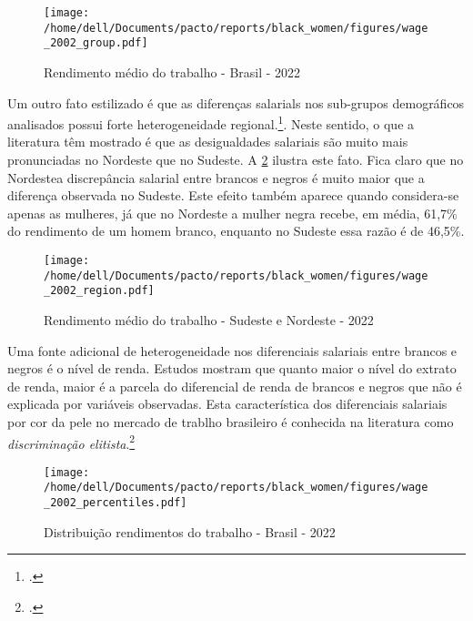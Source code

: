 \documentclass[12pt]{article}
\begin{document}
\begin{figure}[H]
    \centering
    \caption{Rendimento médio do trabalho - Brasil - 2022}
        \texttt{[image: /home/dell/Documents/pacto/reports/black\_women/figures/wage\_2002\_group.pdf]}
    \label{fig:rendimento_trabalho}
\end{figure}

\par Um outro fato estilizado é que as diferenças salarials nos sub-grupos demográficos analisados possui forte heterogeneidade regional.\footcite{campante2004desigualdade}. Neste sentido, o que a literatura têm mostrado é que as desigualdades salariais são muito mais pronunciadas no Nordeste que no Sudeste. A \ref{fig:rendimento_regiao} ilustra este fato. Fica claro que no Nordestea discrepância salarial entre brancos e negros é muito maior que a diferença observada no Sudeste. Este efeito também aparece quando considera-se apenas as mulheres, já que no Nordeste a mulher negra recebe, em média, 61,7\% do rendimento de um homem branco, enquanto no Sudeste essa razão é de 46,5\%.


\begin{figure}[H]
    \centering
    \caption{Rendimento médio do trabalho - Sudeste e Nordeste - 2022}
        \texttt{[image: /home/dell/Documents/pacto/reports/black\_women/figures/wage\_2002\_region.pdf]}
    \label{fig:rendimento_regiao}
\end{figure}

\par Uma fonte adicional de heterogeneidade nos diferenciais salariais entre brancos e negros é o nível de renda. Estudos mostram que quanto maior o nível do extrato de renda, maior é a parcela do diferencial de renda de brancos e negros que não é explicada por variáveis observadas. Esta característica dos diferenciais salariais por cor da pele no mercado de trablho brasileiro é conhecida na literatura como \textit{discriminação elitista}.\footcite[]{soares2000perfil,campante2004desigualdade}

\begin{figure}[H]
    \centering
    \caption{Distribuição rendimentos do trabalho - Brasil - 2022}
        \texttt{[image: /home/dell/Documents/pacto/reports/black\_women/figures/wage\_2002\_percentiles.pdf]}
    \label{fig:rendimento_percentis}
\end{figure}

%
\end{document}
